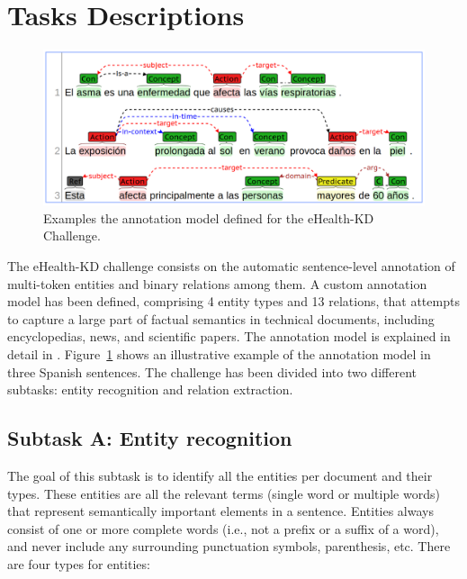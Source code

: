 \documentclass[a4paper,11pt,twocolumn,twoside]{article}
\begin{document}
\section{Tasks Descriptions}\label{sec:task}

\begin{figure}[htb]
  \includegraphics[width=\textwidth]{model.png}
  \caption{Examples the annotation model defined for the eHealth-KD Challenge.\label{fig:model}}
\end{figure}

The eHealth-KD challenge consists on the automatic sentence-level annotation
of multi-token entities and binary relations among them.
A custom annotation model has been defined, comprising 4 entity types and 13 relations,
that attempts to capture a large part of factual semantics in technical documents,
including encyclopedias, news, and scientific papers. The annotation model is explained in detail in . Figure~\ref{fig:model} shows an illustrative example of the annotation model in three Spanish sentences.
The challenge has been divided into two different subtasks: entity recognition and relation extraction.

\subsection{Subtask A: Entity recognition}

The goal of this subtask is to identify all the entities per document and their types. These entities are all the relevant terms (single word or multiple words) that represent semantically important elements in a sentence. Entities always consist of one or more complete words (i.e., not a prefix or a suffix of a word), and never include any surrounding punctuation symbols, parenthesis, etc. There are four types for entities:
\end{document}
